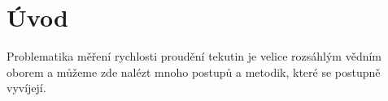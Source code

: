 \section*{Úvod}

Problematika měření rychlosti proudění tekutin je velice rozsáhlým vědním oborem a můžeme zde nalézt mnoho postupů a metodik, které se postupně vyvíjejí.